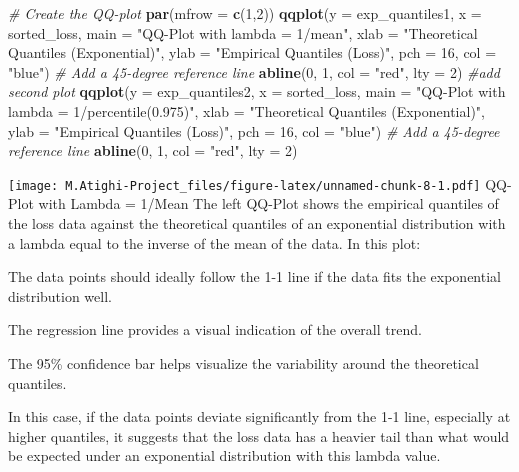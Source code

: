 \documentclass[
  12pt,
]{article}
\newenvironment{Shaded}{\begin{snugshade}}{\end{snugshade}}
\newcommand{\AttributeTok}[1]{\textcolor[rgb]{0.13,0.29,0.53}{#1}}
\newcommand{\CommentTok}[1]{\textcolor[rgb]{0.56,0.35,0.01}{\textit{#1}}}
\newcommand{\DecValTok}[1]{\textcolor[rgb]{0.00,0.00,0.81}{#1}}
\newcommand{\FunctionTok}[1]{\textcolor[rgb]{0.13,0.29,0.53}{\textbf{#1}}}
\newcommand{\NormalTok}[1]{#1}
\newcommand{\StringTok}[1]{\textcolor[rgb]{0.31,0.60,0.02}{#1}}
\begin{document}
\begin{Shaded}
\begin{Highlighting}[]
\CommentTok{\# Create the QQ{-}plot}
\FunctionTok{par}\NormalTok{(}\AttributeTok{mfrow =} \FunctionTok{c}\NormalTok{(}\DecValTok{1}\NormalTok{,}\DecValTok{2}\NormalTok{))}
\FunctionTok{qqplot}\NormalTok{(}\AttributeTok{y =}\NormalTok{ exp\_quantiles1, }\AttributeTok{x =}\NormalTok{ sorted\_loss, }
       \AttributeTok{main =} \StringTok{"QQ{-}Plot with lambda = 1/mean"}\NormalTok{,}
       \AttributeTok{xlab =} \StringTok{"Theoretical Quantiles (Exponential)"}\NormalTok{,}
       \AttributeTok{ylab =} \StringTok{"Empirical Quantiles (Loss)"}\NormalTok{,}
       \AttributeTok{pch =} \DecValTok{16}\NormalTok{, }\AttributeTok{col =} \StringTok{"blue"}\NormalTok{)}
\CommentTok{\# Add a 45{-}degree reference line}
\FunctionTok{abline}\NormalTok{(}\DecValTok{0}\NormalTok{, }\DecValTok{1}\NormalTok{, }\AttributeTok{col =} \StringTok{"red"}\NormalTok{, }\AttributeTok{lty =} \DecValTok{2}\NormalTok{)}
\CommentTok{\#add second plot }
\FunctionTok{qqplot}\NormalTok{(}\AttributeTok{y =}\NormalTok{ exp\_quantiles2, }\AttributeTok{x =}\NormalTok{ sorted\_loss, }
       \AttributeTok{main =} \StringTok{"QQ{-}Plot with lambda = 1/percentile(0.975)"}\NormalTok{,}
       \AttributeTok{xlab =} \StringTok{"Theoretical Quantiles (Exponential)"}\NormalTok{,}
       \AttributeTok{ylab =} \StringTok{"Empirical Quantiles (Loss)"}\NormalTok{,}
       \AttributeTok{pch =} \DecValTok{16}\NormalTok{, }\AttributeTok{col =} \StringTok{"blue"}\NormalTok{)}
\CommentTok{\# Add a 45{-}degree reference line}
\FunctionTok{abline}\NormalTok{(}\DecValTok{0}\NormalTok{, }\DecValTok{1}\NormalTok{, }\AttributeTok{col =} \StringTok{"red"}\NormalTok{, }\AttributeTok{lty =} \DecValTok{2}\NormalTok{)}
\end{Highlighting}
\end{Shaded}

\texttt{[image: M.Atighi-Project\_files/figure-latex/unnamed-chunk-8-1.pdf]}
QQ-Plot with Lambda = 1/Mean The left QQ-Plot shows the empirical
quantiles of the loss data against the theoretical quantiles of an
exponential distribution with a lambda equal to the inverse of the mean
of the data. In this plot:

The data points should ideally follow the 1-1 line if the data fits the
exponential distribution well.

The regression line provides a visual indication of the overall trend.

The 95\% confidence bar helps visualize the variability around the
theoretical quantiles.

In this case, if the data points deviate significantly from the 1-1
line, especially at higher quantiles, it suggests that the loss data has
a heavier tail than what would be expected under an exponential
distribution with this lambda value.
\end{document}
